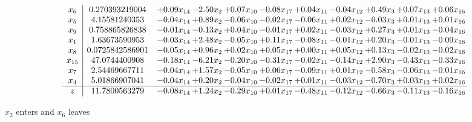 \documentclass[9pt]{article}
\begin{document}
 \[\begin{array}{c| c c@{\hskip 2pt} c@{\hskip 2pt} c@{\hskip 2pt} c@{\hskip 2pt} c@{\hskip 2pt} c@{\hskip 2pt} c@{\hskip 2pt} c@{\hskip 2pt} c@{\hskip 2pt} }
 x_{6}   &  0.270393219004 & +  0.09 x_{14} & -2.50 x_{2} & +  0.07 x_{10} & -0.08 x_{17} & +  0.04 x_{11} & -0.04 x_{12} & +  0.49 x_{3} & +  0.07 x_{13} & +  0.06 x_{16}\\
 x_{5}   &  4.15581240353 & -0.04 x_{14} & +  0.89 x_{2} & -0.06 x_{10} & -0.02 x_{17} & -0.06 x_{11} & +  0.02 x_{12} & -0.03 x_{3} & +  0.01 x_{13} & +  0.01 x_{16}\\
 x_{9}   &  0.758865826838 & -0.01 x_{14} & -0.13 x_{2} & +  0.04 x_{10} & -0.01 x_{17} & +  0.02 x_{11} & -0.03 x_{12} & +  0.27 x_{3} & +  0.01 x_{13} & -0.04 x_{16}\\
 x_{1}   &  1.63673590953 & -0.03 x_{14} & +  2.48 x_{2} & -0.05 x_{10} & +  0.11 x_{17} & -0.08 x_{11} & -0.01 x_{12} & +  0.20 x_{3} & -0.01 x_{13} & -0.09 x_{16}\\
 x_{8}   &  0.0725842586901 & -0.05 x_{14} & +  0.96 x_{2} & +  0.02 x_{10} & +  0.05 x_{17} & +  0.00 x_{11} & +  0.05 x_{12} & +  0.13 x_{3} & -0.02 x_{13} & -0.02 x_{16}\\
 x_{15}   &  47.0744400908 & -0.18 x_{14} & -6.21 x_{2} & -0.20 x_{10} & -0.31 x_{17} & -0.02 x_{11} & -0.14 x_{12} & +  2.90 x_{3} & -0.43 x_{13} & -0.33 x_{16}\\
 x_{7}   &  2.54469667711 & -0.04 x_{14} & +  1.57 x_{2} & -0.05 x_{10} & +  0.06 x_{17} & -0.09 x_{11} & +  0.01 x_{12} & -0.58 x_{3} & -0.06 x_{13} & -0.01 x_{16}\\
 x_{4}   &  5.01866907041 & -0.04 x_{14} & +  0.20 x_{2} & -0.04 x_{10} & -0.02 x_{17} & +  0.01 x_{11} & -0.03 x_{12} & -0.70 x_{3} & +  0.03 x_{13} & +  0.02 x_{16}\\
\hline
z    &  11.7800563279 & -0.08 x_{14} & +  1.24 x_{2} & -0.29 x_{10} & +  0.01 x_{17} & -0.48 x_{11} & -0.12 x_{12} & -0.66 x_{3} & -0.11 x_{13} & -0.16 x_{16}\\
\end{array}\]


 $ x_{2} $ enters and $ x_{6} $ leaves 
\end{document}
